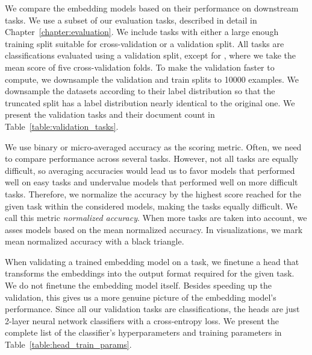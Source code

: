 We compare the embedding models based on their performance on
downstream tasks. We use a subset of our evaluation tasks, described in
detail in Chapter~\ref{chapter:evaluation}. We include tasks with either
a large enough training split suitable for cross-validation or a validation
split. All tasks are classifications evaluated using a validation
split, except for , where we take the mean score of five
cross-validation folds. To make the validation faster to compute, we downsample
the validation and train splits to 10000 examples. We downsample the datasets
according to their label distribution so that the truncated split has a label distribution nearly identical to the original one. We present the validation
tasks and their document count in Table~\ref{table:validation_tasks}.

We use binary or micro-averaged accuracy as the scoring metric. Often, we need
to compare performance across several tasks. However, not all tasks are equally
difficult, so averaging accuracies would lead us to favor models that
performed well on easy tasks and undervalue models that performed well on
more difficult tasks. Therefore, we normalize the accuracy by the highest
score reached for the given task within the considered models,
making the tasks equally difficult. We call this metric \emph{normalized
accuracy}. When more tasks are taken into account, we asses models based on the
mean normalized accuracy. In visualizations, we mark mean normalized accuracy
with a black triangle.

When validating a trained embedding model on a task, we finetune a head that
transforms the embeddings into the output format required for the given task. We
do not finetune the embedding model itself. Besides speeding up the validation,
this gives us a more genuine picture of the embedding model's performance.
Since all our validation tasks are classifications, the heads are just 2-layer
neural network classifiers with a cross-entropy loss. We present the complete
list of the classifier's hyperparameters and training parameters in
Table~\ref{table:head_train_params}.

